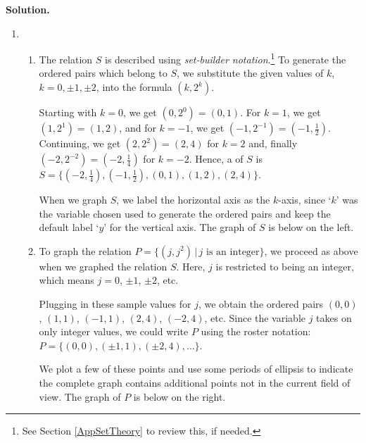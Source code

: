 \documentclass{ximera}
\begin{document}
\begin{example}
\begin{enumerate}
\end{enumerate}

{\bf Solution.}  

\begin{enumerate}

\item \begin{enumerate}

\item The relation $S$ is described using  \textit{set-builder notation}.\footnote{See Section \ref{AppSetTheory} to review this, if needed.}  To generate the ordered pairs  which belong to $S$, we substitute the given values of $k$, $k = 0, \pm 1, \pm 2$, into the formula $\left(k, 2^{k}\right)$. 

\smallskip

 Starting with $k=0$, we get $\left(0, 2^{0} \right) = (0,1)$.  For $k = 1$, we get $\left(1, 2^{1} \right) = (1,2)$, and for $k = -1$, we get $\left(-1, 2^{-1} \right) = \left(-1,\frac{1}{2} \right)$.  Continuing, we get  $\left(2, 2^{2} \right) = (2,4)$ for $k = 2$  and, finally $\left(-2, 2^{-2} \right) = \left(-2,\frac{1}{4} \right)$ for $k = -2$.  Hence, a  of $S$ is  $S = \{  \left(-2,\frac{1}{4} \right),  \left(-1,\frac{1}{2} \right),  \left(0,1 \right),  \left(1,2 \right),  \left(2,4 \right)\}$. 
 
 \smallskip
 
  When we graph $S$, we label the horizontal axis as the $k$-axis, since `$k$' was the variable chosen used to generate the ordered pairs and keep the default label `$y$' for the vertical axis. The graph of $S$ is below on the left.

\item  To graph the relation $P = \{ \left(j, j^2\right) \, | \, \text{$j$ is an integer} \}$, we proceed as above when we graphed the relation $S$.  Here, $j$ is restricted to being an integer, which means $j = 0$, $\pm 1$, $\pm 2$, etc.  

\smallskip

Plugging in these sample values for $j$, we obtain the ordered pairs $(0,0)$, $(1, 1)$, $(-1,1)$, $(2,4)$, $(-2,4)$, etc.  Since the variable $j$ takes on only integer values,  we could write $P$ using the roster notation: $P = \{ (0,0), (\pm 1, 1), (\pm 2, 4), \dots \}$.   

\smallskip

We plot a few of these points and use some periods of ellipsis to indicate the complete graph contains additional points not in the current field of view.  The graph of $P$ is below on the right. 




\end{enumerate}
\end{enumerate}
\end{example}
\end{document}
